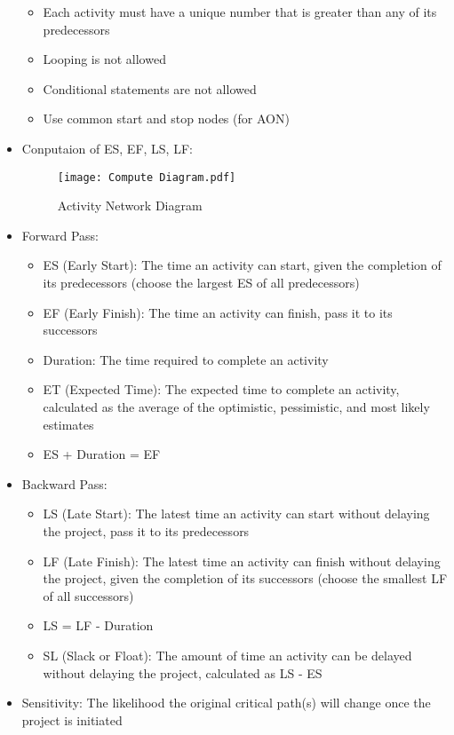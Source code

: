 \documentclass[12pt,openany]{book}
\begin{document}
\begin{itemize}
\begin{itemize}
        \item Each activity must have a unique number that is greater than any of its predecessors
        \item Looping is not allowed
        \item Conditional statements are not allowed
        \item Use common start and stop nodes (for AON)
    \end{itemize}
    \item Conputaion of ES, EF, LS, LF:
    \begin{figure}[ht]
        \centering
        \texttt{[image: Compute Diagram.pdf]}
        \caption{Activity Network Diagram}
    \end{figure}
    \item Forward Pass:
    \begin{itemize}
        \item ES (Early Start): The time an activity can start, given the completion of its predecessors (choose the largest ES of all predecessors)
        \item EF (Early Finish): The time an activity can finish, pass it to its successors
        \item Duration: The time required to complete an activity
        \item ET (Expected Time): The expected time to complete an activity, calculated as the average of the optimistic, pessimistic, and most likely estimates
        \item ES + Duration = EF
    \end{itemize}
    \item Backward Pass:
    \begin{itemize}
        \item LS (Late Start): The latest time an activity can start without delaying the project, pass it to its predecessors
        \item LF (Late Finish): The latest time an activity can finish without delaying the project, given the completion of its successors (choose the smallest LF of all successors)
        \item LS = LF - Duration
        \item SL (Slack or Float): The amount of time an activity can be delayed without delaying the project, calculated as LS - ES
    \end{itemize}
    \item Sensitivity: The likelihood the original critical path(s) will change once the project is initiated
\end{itemize}
\end{document}
